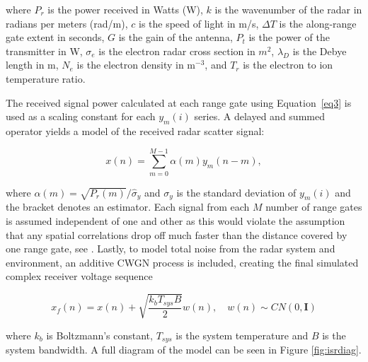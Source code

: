 \documentclass[draft,ras]{agutex}
\begin{document}
\begin{article}
 \noindent where $P_r$ is the power received in Watts (W), $k$ is the wavenumber of the radar in radians per meters (rad/m), $c$ is the speed of light in m/s, $\Delta T$ is the along-range gate extent in seconds, $G$ is the gain of the antenna, $P_t$ is the power of the transmitter in W, $\sigma_e$ is the electron radar cross section in $m^2$,  $\lambda_D$ is the Debye length in m, $N_e$ is the electron density in m$^{-3}$, and $T_r$ is the electron to ion temperature ratio.
  
The received signal power calculated at each range gate using Equation~\ref{eq3} is used as a scaling constant for each $y_m(i)$ series.  A delayed and summed operator yields a model of the received radar scatter signal:
 
\begin{equation}
\label{eq4}
x(n) = \displaystyle\sum\limits_{m =0}^{M-1} \alpha(m)y_m(n-m),
\end{equation}

\noindent where $\alpha(m) = \sqrt{P_r(m)}/\widehat{\sigma}_y$ and $\sigma_y$ is the standard deviation of $y_m(i)$ and the bracket denotes an estimator. Each signal from each $M$ number of range gates is assumed independent of one and other as this would violate the assumption that any spatial correlations drop off much faster than the distance covered by one range gate, see \citet{RDS:RDS20236}. Lastly, to model total noise from the radar system and environment, an additive CWGN process is included, creating the final simulated complex receiver voltage sequence

\begin{equation}
\label{eq:addnoise}
x_f(n) = x(n) +\sqrt{\frac{k_bT_{sys}B}{2}} w(n), \quad w(n)\sim CN(0,\mathbf{I})
\end{equation}

\noindent where $k_b$ is Boltzmann's constant, $T_{sys}$ is the system temperature and $B$ is the system bandwidth.
A full diagram of the model can be seen in Figure \ref{fig:isrdiag}.


\end{article}
\end{document}

